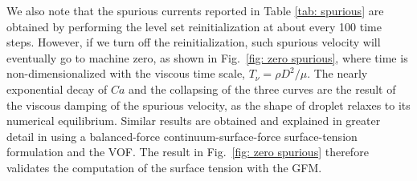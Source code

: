 We also note that the spurious currents reported in Table \ref{tab: spurious} are obtained by performing the level set reinitialization at about every 100 time steps. However, if we turn off the reinitialization, such spurious velocity will eventually go to machine zero, as shown in Fig.\ \ref{fig: zero spurious}, where time is non-dimensionalized with the viscous time scale, $T_{\nu}=\rho D^2/\mu$. The nearly exponential decay of $Ca$ and the collapsing of the three curves are the result of the viscous damping of the spurious velocity, as the shape of droplet relaxes to its numerical equilibrium. Similar results are obtained and explained in greater detail in \cite{Popinet_JCP_2009} using a balanced-force continuum-surface-force surface-tension
formulation and the VOF. 
The result in Fig.\ \ref{fig: zero spurious} therefore validates the computation of the surface tension with the GFM.


%



